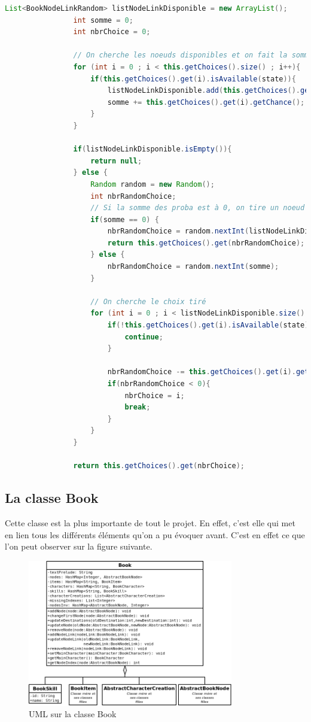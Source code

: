 			\begin{lstlisting}[gobble=16, language=java, label=lst:getRandomChoices, caption=getRandomChoice()]
				List<BookNodeLinkRandom> listNodeLinkDisponible = new ArrayList();
				int somme = 0;
				int nbrChoice = 0;

				// On cherche les noeuds disponibles et on fait la somme des probabilités
				for (int i = 0 ; i < this.getChoices().size() ; i++){
					if(this.getChoices().get(i).isAvailable(state)){
						listNodeLinkDisponible.add(this.getChoices().get(i));
						somme += this.getChoices().get(i).getChance();
					}
				}

				if(listNodeLinkDisponible.isEmpty()){
					return null;
				} else {
					Random random = new Random();
					int nbrRandomChoice;
					// Si la somme des proba est à 0, on tire un noeud au hasard
					if(somme == 0) {
						nbrRandomChoice = random.nextInt(listNodeLinkDisponible.size());
						return this.getChoices().get(nbrRandomChoice);
					} else {
						nbrRandomChoice = random.nextInt(somme);
					}

					// On cherche le choix tiré
					for (int i = 0 ; i < listNodeLinkDisponible.size() ; i++){
						if(!this.getChoices().get(i).isAvailable(state)){
							continue;
						}

						nbrRandomChoice -= this.getChoices().get(i).getChance();
						if(nbrRandomChoice < 0){
							nbrChoice = i;
							break;
						}
					}
				}

				return this.getChoices().get(nbrChoice);
			\end{lstlisting}

		\subsection{La classe Book}
			\label{subsec:book}

			Cette classe est la plus importante de tout le projet. En effet, c'est elle qui met en lien tous les différents éléments qu'on a pu évoquer avant. C'est en effet ce que l'on peut observer sur la figure suivante.

			\begin{figure}[H]
				\centering\includegraphics[width=0.8\textwidth, keepaspectratio]{img/book.png}
				\caption{UML sur la classe Book}
			\end{figure}

